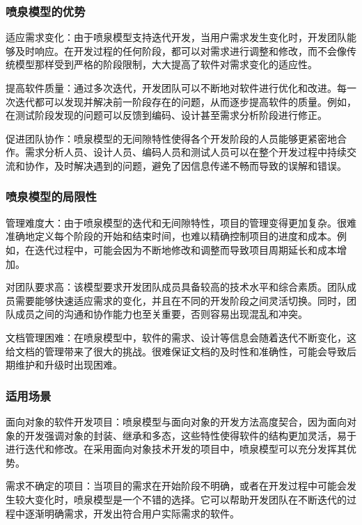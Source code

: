 \subsubsection{喷泉模型的优势}

适应需求变化：由于喷泉模型支持迭代开发，当用户需求发生变化时，开发团队能够及时响应。在开发过程的任何阶段，都可以对需求进行调整和修改，而不会像传统模型那样受到严格的阶段限制，大大提高了软件对需求变化的适应性。

提高软件质量：通过多次迭代，开发团队可以不断地对软件进行优化和改进。每一次迭代都可以发现并解决前一阶段存在的问题，从而逐步提高软件的质量。例如，在测试阶段发现的问题可以反馈到编码、设计甚至需求分析阶段进行修正。

促进团队协作：喷泉模型的无间隙特性使得各个开发阶段的人员能够更紧密地合作。需求分析人员、设计人员、编码人员和测试人员可以在整个开发过程中持续交流和协作，及时解决遇到的问题，避免了因信息传递不畅而导致的误解和错误。

\subsubsection{喷泉模型的局限性}

管理难度大：由于喷泉模型的迭代和无间隙特性，项目的管理变得更加复杂。很难准确地定义每个阶段的开始和结束时间，也难以精确控制项目的进度和成本。例如，在迭代过程中，可能会因为不断地修改和调整而导致项目周期延长和成本增加。

对团队要求高：该模型要求开发团队成员具备较高的技术水平和综合素质。团队成员需要能够快速适应需求的变化，并且在不同的开发阶段之间灵活切换。同时，团队成员之间的沟通和协作能力也至关重要，否则容易出现混乱和冲突。

文档管理困难：在喷泉模型中，软件的需求、设计等信息会随着迭代不断变化，这给文档的管理带来了很大的挑战。很难保证文档的及时性和准确性，可能会导致后期维护和升级时出现困难。

\subsubsection{适用场景}

面向对象的软件开发项目：喷泉模型与面向对象的开发方法高度契合，因为面向对象的开发强调对象的封装、继承和多态，这些特性使得软件的结构更加灵活，易于进行迭代和修改。在采用面向对象技术开发的项目中，喷泉模型可以充分发挥其优势。

需求不确定的项目：当项目的需求在开始阶段不明确，或者在开发过程中可能会发生较大变化时，喷泉模型是一个不错的选择。它可以帮助开发团队在不断迭代的过程中逐渐明确需求，开发出符合用户实际需求的软件。

